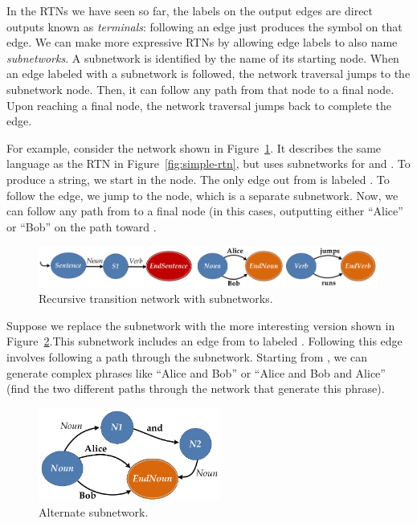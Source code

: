 \label{sec:subnetworks}  In the RTNs we have seen so far, the labels on the output edges are direct outputs known as \emph{terminals}: following an edge just produces the symbol on that edge.  We can make more expressive RTNs by allowing edge labels to also name \emph{subnetworks}.  A subnetwork is identified by the name of its starting node.  When an edge labeled with a subnetwork is followed, the network traversal jumps to the subnetwork node.  Then, it can follow any path from that node to a final node.  Upon reaching a final node, the network traversal jumps back to complete the edge.  

For example, consider the network shown in Figure~\ref{fig:subnetwork-rtn}.  It describes the same language as the RTN in Figure~\ref{fig:simple-rtn}, but uses subnetworks for  and .  To produce a string, we start in the  node.  The only edge out from  is labeled .  To follow the edge, we jump to the  node, which is a separate subnetwork.  Now, we can follow any path from  to a final node (in this cases, outputting either ``Alice'' or ``Bob'' on the path toward .  

\begin{figure}[!ht]
\centering
\includegraphics[width=4.75in]{figures/subnetwork-rtn.pdf}
\caption{Recursive transition network with subnetworks.}\label{fig:subnetwork-rtn}
\end{figure}

Suppose we replace the  subnetwork with the more interesting version shown in Figure~\ref{fig:andsubnetwork-rtn}.This subnetwork includes an edge from  to  labeled .  Following this edge involves following a path through the  subnetwork.  Starting from , we can generate complex phrases like ``Alice and Bob'' or ``Alice and Bob and Alice'' (find the two different paths through the network that generate this phrase).

\begin{figure}[!hbt]
\centering
\includegraphics[height=1.2in]{figures/andsubnetwork-rtn.pdf}
\caption{Alternate  subnetwork.}\label{fig:andsubnetwork-rtn}
\end{figure}


